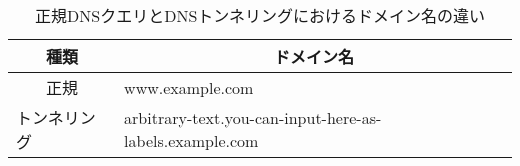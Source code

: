 \begin{table}[htbp]
 \caption{正規DNSクエリとDNSトンネリングにおけるドメイン名の違い}
 \centering
  \begin{tabular}{l|l}
    \toprule
		\multicolumn{1}{c|}{\textbf{種類}} & \multicolumn{1}{c}{\textbf{ドメイン名}} \\
    \midrule
		\multicolumn{1}{c|}{正規} &  www.example.com \\ \hline
    トンネリング & arbitrary-text.you-can-input-here-as-labels.example.com\\
    \bottomrule
  \end{tabular}
 \label{tab:feature-tunnel}
\end{table}
